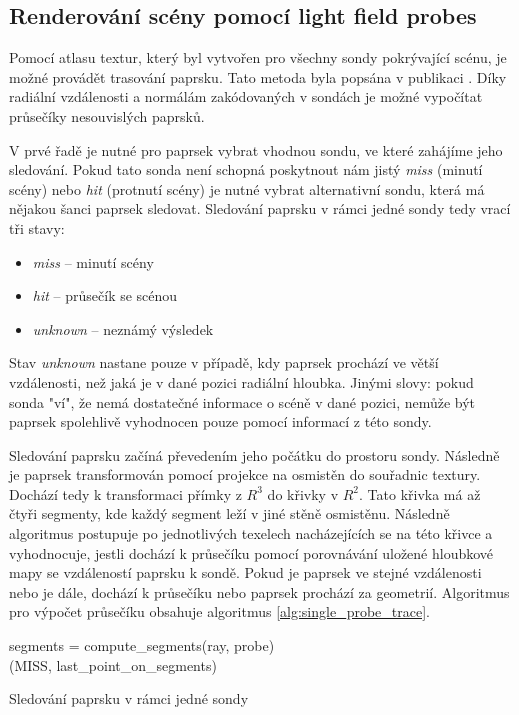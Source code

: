 \subsection{Renderování scény pomocí light field probes}\label{sec:render_lfp}
Pomocí atlasu textur, který byl vytvořen pro všechny sondy pokrývající scénu, je možné provádět trasování paprsku. Tato metoda byla popsána v publikaci \cite{light_field_probes}. Díky radiální vzdálenosti a normálám zakódovaných v sondách je možné vypočítat průsečíky nesouvislých paprsků. 

V prvé řadě je nutné pro paprsek vybrat vhodnou sondu, ve které zahájíme jeho sledování. Pokud tato sonda není schopná poskytnout nám jistý \textit{miss} (minutí scény) nebo \textit{hit} (protnutí scény) je nutné vybrat alternativní sondu, která má nějakou šanci paprsek sledovat. Sledování paprsku v rámci jedné sondy tedy vrací tři stavy:
\begin{itemize}
    \item \textit{miss} -- minutí scény
    \item \textit{hit} -- průsečík se scénou
    \item \textit{unknown} -- neznámý výsledek
\end{itemize}

Stav \textit{unknown} nastane pouze v případě, kdy paprsek prochází ve větší vzdálenosti, než jaká je v dané pozici radiální hloubka. Jinými slovy: pokud sonda "ví", že nemá dostatečné informace o scéně v dané pozici, nemůže být paprsek spolehlivě vyhodnocen pouze pomocí informací z této sondy. 

Sledování paprsku začíná převedením jeho počátku do prostoru sondy. Následně je paprsek transformován pomocí projekce na osmistěn do souřadnic textury. Dochází tedy k transformaci přímky z $R^3$ do křivky v $R^2$. Tato křivka má až čtyři segmenty, kde každý segment leží v jiné stěně osmistěnu. Následně algoritmus postupuje po jednotlivých texelech nacházejících se na této křivce a vyhodnocuje, jestli dochází k průsečíku pomocí porovnávání uložené hloubkové mapy se vzdáleností paprsku k sondě. Pokud je paprsek ve stejné vzdálenosti nebo je dále, dochází k průsečíku nebo paprsek prochází za geometrií. Algoritmus pro výpočet průsečíku obsahuje algoritmus \ref{alg:single_probe_trace}. 

\begin{center}
	\begin{czechalgorithm}[H] \label{alg:single_probe_trace}
	    segments = compute\_segments(ray, probe)\\
	    \KwRet (MISS, last\_point\_on\_segments)
		\caption{Sledování paprsku v rámci jedné sondy}
	\end{czechalgorithm}
\end{center}

